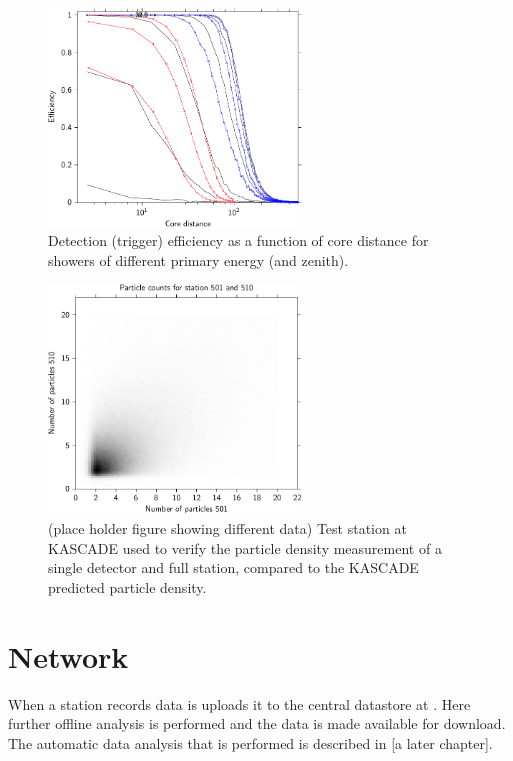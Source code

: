 \begin{figure}
    \centering
    \includegraphics[width=0.6\textwidth]
                    {plots/experiment/efficiency_two_16}
    \caption{Detection (trigger) efficiency as a function of core distance for showers of different primary energy (and zenith).}
    \label{fig:efficiency_two_16}
\end{figure}


\begin{figure}
    \centering
    \includegraphics[width=0.6\textwidth]
                    {plots/experiment/n_501_510_sum}
    \caption{(place holder figure showing different data) Test station at KASCADE used to verify the particle density measurement of a single detector and full station, compared to the KASCADE predicted particle density.}
    \label{fig:n_501_510_sum}
\end{figure}


\section{Network}

When a station records data is uploads it to the central datastore at \nikhef. Here further offline analysis is performed and the data is made available for download. The automatic data analysis that is performed is described in [a later chapter]. 

